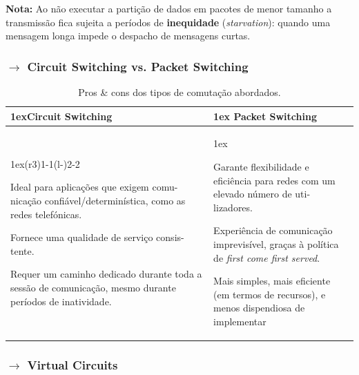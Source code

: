 \noindent \textbf{Nota:} Ao não executar a partição de dados em pacotes de menor tamanho a transmissão fica sujeita a períodos de \textbf{inequidade} (\textit{starvation}): quando uma mensagem longa impede o despacho de
mensagens curtas.

\subsubsection[1.2.3 Circuit Switching vs. Packet Switching]{$\pmb{\rightarrow}$ Circuit Switching vs. Packet Switching}
\vspace{-1 em}
\begin{table}[H]
    \begin{tabularx}{\linewidth}{>{\parskip1ex}X@{\kern4\tabcolsep}>{\parskip1ex}X}
    \toprule
    \hfil\bfseries Circuit Switching
    &
    \hfil\bfseries Packet Switching
    \\\cmidrule(r{3\tabcolsep}){1-1}\cmidrule(l{-\tabcolsep}){2-2}
    
    Ideal para aplicações que exigem comu- nicação confiável/determinística, como as redes telefónicas.\par
    Fornece uma qualidade de serviço consis- tente.\par
    Requer um caminho dedicado durante toda a sessão de comunicação, mesmo durante períodos de inatividade.
    &
    
    Garante flexibilidade e eficiência para redes com um elevado número de uti- lizadores.\par
    Experiência de comunicação imprevisível, graças à política de \textit{first come first served}.\par
    Mais simples, mais eficiente (em termos de recursos), e menos dispendiosa de implementar
    \\\bottomrule
    \end{tabularx}
    \caption{Pros \& cons dos tipos de comutação abordados.}
\end{table}
\subsubsection[1.2.4 Virtual Circuits]{$\pmb{\rightarrow}$ Virtual Circuits}

